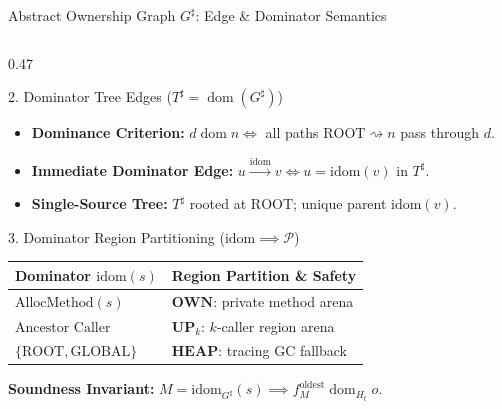 \documentclass[11pt]{beamer}
\providecommand{\ROOT}{\text{ROOT}}
\providecommand{\GLOBAL}{\text{GLOBAL}}
\providecommand{\dom}{\mathrel{\text{dom}}}
\providecommand{\idom}{\text{idom}}
\begin{document}
\begin{frame}{Abstract Ownership Graph $G^\sharp$: Edge \& Dominator Semantics}
\begin{columns}[T,onlytextwidth]
    \begin{column}{0.47\textwidth}
      \begin{block}{2. Dominator Tree Edges ($T^\sharp = \dom(G^\sharp)$)}
        \fontsize{5.8pt}{7.0pt}\selectfont
        \begin{itemize}\setlength{\itemsep}{0.6pt}\setlength{\topsep}{0pt}\setlength{\parskip}{0pt}\setlength{\parsep}{0pt}
          \item \textbf{Dominance Criterion:}
            $d \dom n \iff$ all paths $\ROOT \rightsquigarrow n$ pass through $d$.
          \item \textbf{Immediate Dominator Edge:}
            $u \xrightarrow{\idom} v \iff u = \idom(v) \text{ in } T^\sharp$.
          \item \textbf{Single-Source Tree:} $T^\sharp$ rooted at $\ROOT$; unique parent $\idom(v)$.
        \end{itemize}
      \end{block}
      \vspace{-0.6em}
      \begin{alertblock}{3. Dominator Region Partitioning ($\idom \implies \mathcal{P}$)}
        \fontsize{5.7pt}{6.8pt}\selectfont
        \setlength{\tabcolsep}{2.5pt}
        \begin{tabular}{@{}ll@{}}
          \toprule
          \textbf{Dominator $\idom(s)$} & \textbf{Region Partition \& Safety} \\
          \midrule
          $\text{AllocMethod}(s)$ & $\mathbf{OWN}$: private method arena \\
          $\text{Ancestor Caller}$ & $\mathbf{UP}_k$: $k$-caller region arena \\
          $\{\ROOT, \GLOBAL\}$ & $\mathbf{HEAP}$: tracing GC fallback \\
          \bottomrule
        \end{tabular}\par\vspace{1pt}
        \textbf{Soundness Invariant:}
        $M = \idom_{G^\sharp}(s) \implies f_M^{\text{oldest}} \dom_{H_t} o$.
      \end{alertblock}
    \end{column}
  \end{columns}
\end{frame}
\endgroup
\end{document}
